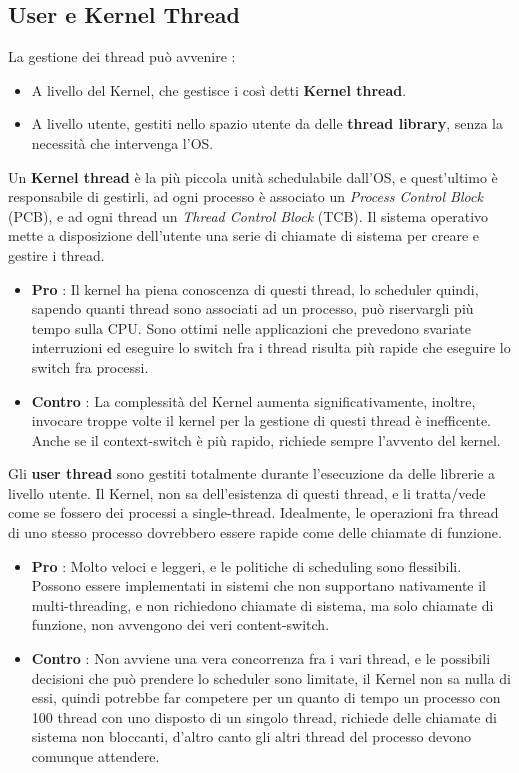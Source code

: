 \documentclass[12pt, letterpaper]{article}
\begin{document}
\subsection{User e Kernel Thread}
La gestione dei thread può avvenire :\begin{itemize}
    \item A livello del Kernel, che gestisce i così detti \textbf{Kernel thread}.
    \item A livello utente, gestiti nello spazio utente da delle \textbf{thread library}, senza la necessità che intervenga l'OS.
\end{itemize} 
Un \textbf{Kernel thread} è la più piccola unità schedulabile dall'OS, e quest'ultimo è responsabile di gestirli, ad 
ogni processo è associato un \textit{Process Control Block} (PCB), e ad ogni thread un \textit{Thread Control Block} (TCB). 
Il sistema operativo mette a disposizione dell'utente una serie di chiamate di sistema per creare e gestire i thread.\begin{itemize}
    \item \textbf{Pro} : Il kernel ha piena conoscenza di questi thread, lo scheduler quindi, sapendo quanti thread sono associati 
    ad un processo, può riservargli più tempo sulla CPU. Sono ottimi nelle applicazioni che prevedono svariate interruzioni 
    ed eseguire lo switch fra i thread risulta più rapide che eseguire lo switch fra processi. 
    \item \textbf{Contro} : La complessità del Kernel aumenta significativamente, inoltre, invocare troppe 
    volte il kernel per 
    la gestione di questi thread è inefficente. Anche se il context-switch è più rapido, richiede sempre l'avvento del 
    kernel.
\end{itemize}
Gli \textbf{user thread} sono gestiti totalmente durante l'esecuzione da delle librerie a livello utente. Il Kernel, non 
sa dell'esistenza di questi thread, e li tratta/vede come se fossero dei processi a single-thread. Idealmente, le operazioni fra 
thread di uno stesso processo dovrebbero essere rapide come delle chiamate di funzione.\begin{itemize}
    \item \textbf{Pro} : Molto veloci e leggeri, e le politiche di scheduling sono flessibili. Possono essere 
    implementati in sistemi che non supportano nativamente il multi-threading, e non richiedono chiamate di sistema, ma 
    solo chiamate di funzione, non avvengono dei veri content-switch. 
    \item \textbf{Contro} : Non avviene una vera concorrenza fra i vari thread, e le possibili decisioni che può 
    prendere lo scheduler sono limitate, il Kernel non sa nulla di essi, quindi potrebbe far competere per un quanto 
    di tempo un processo con 100 thread con uno disposto di un singolo thread, richiede delle chiamate di sistema non 
    bloccanti, d'altro canto gli altri thread del processo devono comunque attendere.
\end{itemize}
\end{document}
